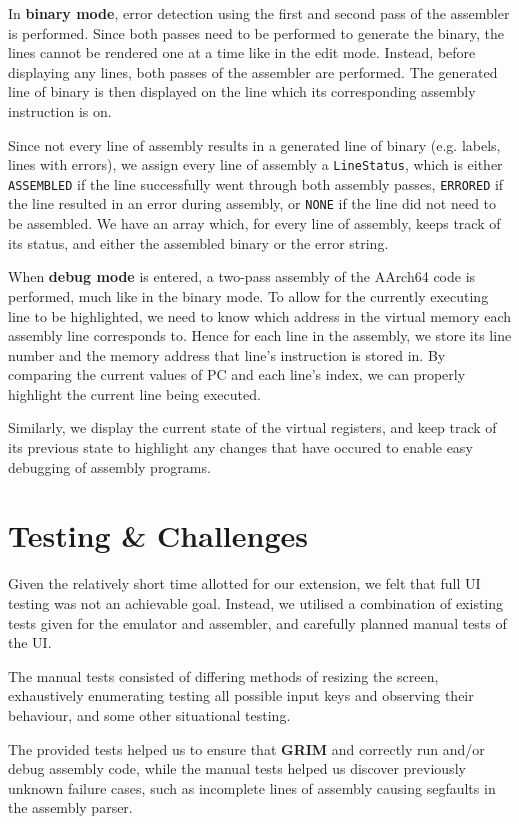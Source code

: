 \documentclass{ictex}
\begin{document}
In \textbf{binary mode}, error detection using the first and second pass of the assembler is performed. Since both passes need to be performed to generate the binary, the lines cannot be rendered one at a time like in the edit mode. Instead, before displaying any lines, both passes of the assembler are performed. The generated line of binary is then displayed on the line which its corresponding assembly instruction is on.

Since not every line of assembly results in a generated line of binary (e.g. labels, lines with errors), we assign every line of assembly a \texttt{LineStatus}, which is either \texttt{ASSEMBLED} if the line successfully went through both assembly passes, \texttt{ERRORED} if the line resulted in an error during assembly, or \texttt{NONE} if the line did not need to be assembled. We have an array which, for every line of assembly, keeps track of its status, and either the assembled binary or the error string.

When \textbf{debug mode} is entered, a two-pass assembly of the AArch64 code is performed, much like in the binary mode. To allow for the currently executing line to be highlighted, we need to know which address in the virtual memory each assembly line corresponds to. Hence for each line in the assembly, we store its line number and the memory address that line's instruction is stored in. By comparing the current values of PC and each line's index, we can properly highlight the current line being executed.

Similarly, we display the current state of the virtual registers, and keep track of its previous state to highlight any changes that have occured to enable easy debugging of assembly programs.

\section{Testing \& Challenges}

Given the relatively short time allotted for our extension, we felt that full UI testing was not an achievable goal. Instead, we utilised a combination of existing tests given for the emulator and assembler, and carefully planned manual tests of the UI.

The manual tests consisted of differing methods of resizing the screen, exhaustively enumerating testing all possible input keys and observing their behaviour, and some other situational testing.

The provided tests helped us to ensure that \textbf{GRIM} and correctly run and/or debug assembly code, while the manual tests helped us discover previously unknown failure cases, such as incomplete lines of assembly causing segfaults in the assembly parser.
\end{document}
